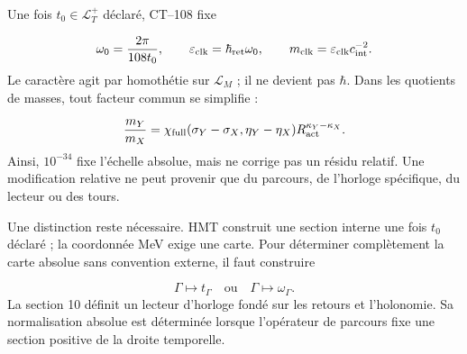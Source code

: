 Une fois \(t_0\in\mathcal L_T^+\) déclaré, CT--108 fixe

\[
 \omega_0=\frac{2\pi}{108t_0},\qquad
 \varepsilon_{\rm clk}=\hbar_{\rm ret}\omega_0,
 \qquad
 m_{\rm clk}=\varepsilon_{\rm clk}c_{\rm int}^{-2}.
\]
Le caractère agit par homothétie sur \(\mathcal L_M\) ; il ne devient pas \(\hbar\). Dans les quotients de masses, tout facteur commun se simplifie :

\[
 \frac{m_Y}{m_X}
 =\chi_{\rm full}(\sigma_Y-\sigma_X,\eta_Y-\eta_X)
 R_{\rm act}^{\kappa_Y-\kappa_X}.
\]
Ainsi, \(10^{-34}\) fixe l'échelle absolue, mais ne corrige pas un résidu relatif. Une modification relative ne peut provenir que du parcours, de l'horloge spécifique, du lecteur ou des tours.

Une distinction reste nécessaire. HMT construit une section interne une fois \(t_0\) déclaré ; la coordonnée MeV exige une carte. Pour déterminer complètement la carte absolue sans convention externe, il faut construire

\[
 \Gamma\longmapsto t_\Gamma
 \quad\text{ou}\quad
 \Gamma\longmapsto\omega_\Gamma.
\]
La section 10 définit un lecteur d'horloge fondé sur les retours et l'holonomie. Sa normalisation absolue est déterminée lorsque l'opérateur de parcours fixe une section positive de la droite temporelle.

